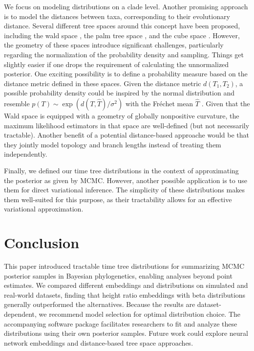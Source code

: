 \documentclass[10pt,letterpaper]{article}
\begin{document}
We focus on modeling distributions on a clade level. Another promising approach is to model the distances between taxa, corresponding to their evolutionary distance. Several different tree spaces around this concept have been proposed, including the wald space \cite{wald}, the palm tree space \cite{tropical}, and the cube space \cite{cube}. However, the geometry of these spaces introduce significant challenges, particularly regarding the normalization of the probability density and sampling. Things get slightly easier if one drops the requirement of calculating the unnormalized posterior. One exciting possibility is to define a probability measure based on the distance metric defined in these spaces. Given the distance metric $d(T_1, T_2)$, a possible probability density could be inspired by the normal distribution and resemble $p(T) \sim \exp(d(T, \hat{T}) / \sigma^2)$ with the Fréchet mean $\hat{T}$ \cite{frechetmeanvar}. Given that the Wald space is equipped with a geometry of globally nonpositive curvature, the maximum likelihood estimators in that space are well-defined \cite{gaussianriemann} (but not necessarily tractable). Another benefit of a potential distance-based approache would be that they jointly model topology and branch lengths instead of treating them independently.

Finally, we defined our time tree distributions in the context of approximating the posterior as given by MCMC. However, another possible application is to use them for direct variational inference. The simplicity of these distributions makes them well-suited for this purpose, as their tractability allows for an effective variational approximation.

\section*{Conclusion}

This paper introduced tractable time tree distributions for summarizing MCMC posterior samples in Bayesian phylogenetics, enabling analyses beyond point estimates. We compared different embeddings and distributions on simulated and real-world datasets, finding that height ratio embeddings with beta distributions generally outperformed the alternatives. Because the results are dataset-dependent, we recommend model selection for optimal distribution choice. The accompanying software package facilitates researchers to fit and analyze these distributions using their own posterior samples. Future work could explore neural network embeddings and distance-based tree space approaches.
\end{document}
